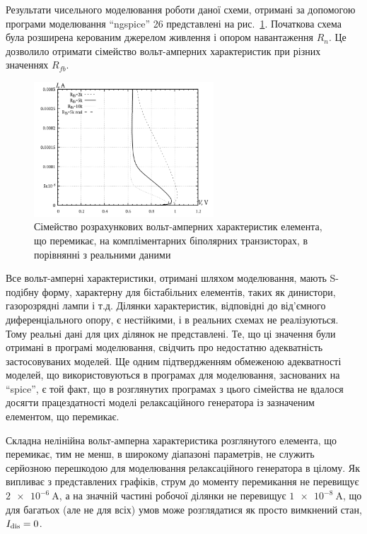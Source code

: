 Результати чисельного моделювання роботи даної схеми, отримані
за допомогою програми моделювання ``ngspice'' 26 представлені на
рис.~\ref{atu:f:relax3d_sw_vah}. Початкова схема була розширена керованим
джерелом живлення і опором навантаження
$R_n $. Це дозволило отримати сімейство вольт-амперних
характеристик при різних значеннях
$R_{fb} $.

\begin{figure}[htb!]
  \centerline{\includegraphics[width=0.6\textwidth]{p/relax3d_sw_va.png} }
\caption{Сімейство розрахункових вольт-амперних характеристик
елемента, що перемикає, на компліментарних біполярних
транзисторах, в порівнянні з реальними даними}
\label{atu:f:relax3d_sw_vah}
\end{figure}


Все вольт-амперні характеристики, отримані шляхом моделювання,
мають S-подібну форму, характерну для бістабільних
елементів, таких як динистори, газорозрядні лампи і т.д. Ділянки
характеристик, відповідні до від'ємного диференціального
опору, є нестійкими, і в реальних схемах не реалізуються. Тому
реальні дані для цих ділянок не представлені. Те, що ці значення
були отримані в програмі моделювання, свідчить про недостатню
адекватність застосовуваних моделей. Ще одним підтвердженням
обмеженою адекватності моделей, що використовуються в
програмах для моделювання, заснованих на ``spice'', є той факт, що
в розглянутих програмах з цього сімейства не вдалося досягти
працездатності моделі релаксаційного генератора із зазначеним
елементом, що перемикає.


Складна нелінійна вольт-амперна характеристика розглянутого
елемента, що перемикає, тим не менш, в широкому діапазоні
параметрів, не служить серйозною перешкодою для
моделювання релаксаційного генератора в цілому. Як випливає
з представлених графіків, струм до моменту перемикання не
перевищує
$\SI{2 e-6}{\ampere} $, а на значній частині робочої ділянки не перевищує
$\SI{1e-8}{\ampere} $, що для багатьох (але не для всіх) умов може
розглядатися як просто вимкнений стан,
$I _\mathrm{dis} = 0 $.

